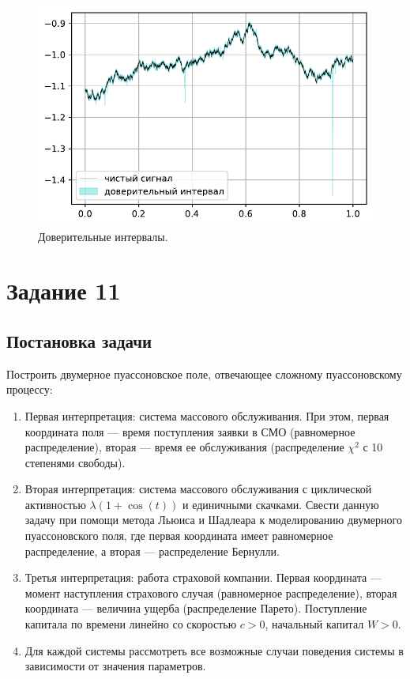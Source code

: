 \documentclass[16pt]{article}
\begin{document}
\begin{figure}[h]
	\center
	\includegraphics[scale=0.7]{10_6.pdf}
	\caption{Доверительные интервалы.}
\end{figure}

\newpage
\section{Задание 11}
\subsection{Постановка задачи}
Построить двумерное пуассоновское поле, отвечающее сложному пуассоновскому процессу:
\begin{enumerate}
	\item Первая интерпретация: система массового обслуживания. При этом, первая координата поля --- время поступления заявки в СМО (равномерное распределение), вторая --- время ее обслуживания (распределение $\chi^2$ с 10 степенями свободы).
	\item Вторая интерпретация: система массового обслуживания с циклической активностью $\lambda(1 + \cos(t))$ и единичными скачками. Свести данную задачу при помощи метода Льюиса и Шадлеара к моделированию двумерного пуассоновского поля, где первая координата имеет равномерное распределение, а вторая --- распределение Бернулли.
	\item Третья интерпретация: работа страховой компании. Первая координата --- момент наступления страхового случая (равномерное распределение), вторая координата --- величина ущерба (распределение Парето). Поступление капитала по времени линейно со скоростью $c > 0$, начальный капитал $W > 0$.
	\item Для каждой системы рассмотреть все возможные случаи поведения системы в зависимости от значения параметров.
\end{enumerate}
\end{document}
